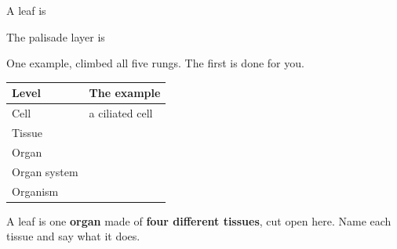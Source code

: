 \documentclass[12pt,a4paper]{article}
\begin{document}
\vspace{4pt}
\noindent A leaf is \blank[12.2cm]
\vspace{8pt}

\noindent The palisade layer is \blank[10.6cm]


\noindent One example, climbed all five rungs. The first is done for you.

\vspace{10pt}
\noindent
\begin{tabularx}{\textwidth}{|p{3.6cm}|X|}
  \hline
  \textbf{Level} & \textbf{The example} \\
  \hline
  Cell \rule[-0.75em]{0pt}{2.2em}         & a ciliated cell \\ \hline
  Tissue \rule[-0.75em]{0pt}{2.2em}       & \\ \hline
  Organ \rule[-0.75em]{0pt}{2.2em}        & \\ \hline
  Organ system \rule[-0.75em]{0pt}{2.2em} & \\ \hline
  Organism \rule[-0.75em]{0pt}{2.2em}     & \\ \hline
\end{tabularx}



\noindent A leaf is one \textbf{organ} made of \textbf{four different tissues}, cut
open here. Name each tissue and say what it does.
\end{document}
